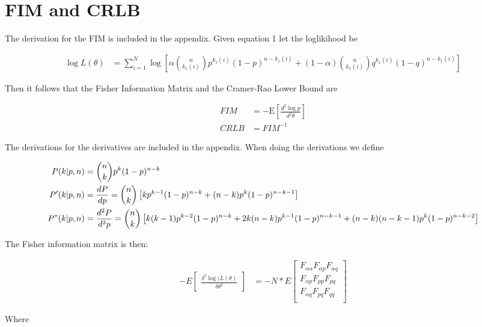 \section{FIM and CRLB}

The derivation for the FIM is included in the appendix. Given equation 1 let the loglikihood be

\begin{align*}
\log L(\mathbb{\theta}) &= \sum_{i=1}^{N} \log \left[ \alpha \binom{n}{k_1(i)} p^{k_1(i)} (1-p)^{n - k_1(i)} + (1-\alpha) \binom{n}{k_1(i)} q^{k_1(i)} (1-q)^{n - k_1(i)}  \right] 
\end{align*}

Then it follows that the Fisher Information Matrix and the Cramer-Rao Lower Bound are

\begin{align*}
FIM &= -\mathrm{E} \left[\frac{d^2 \log p}{d^2\mathbb{\theta}}\right] \\
CRLB &= FIM^{-1}
\end{align*}

The derivations for the derivatives are included in the appendix. When doing the derivations we define

\begin{align*}
P(k | p, n) &= \binom{n}{k}p^{k}(1 - p)^{n - k} \\
P'(k | p, n) &= \frac{dP}{dp} = \binom{n}{k}\left[kp^{k - 1}(1 - p)^{n - k} + (n - k)p^{k}(1 - p)^{n - k - 1}\right]\\
P"(k | p, n) &= \frac{d^2P}{d^2p} = \binom{n}{k}\left[k(k - 1)p^{k - 2}(1 - p)^{n - k} + 2k(n - k)p^{k - 1}(1 - p)^{n - k - 1} + (n - k)(n - k - 1)p^k(1 - p)^{n - k - 2}\right]\\
\end{align*}

The Fisher information matrix is then:

\begin{align*}
-E\begin{bmatrix}\frac{\delta^2\log(L(\mathbb{\theta})}{{\delta\theta}^2}\end{bmatrix} &= -N * E\begin{bmatrix}
F_{\alpha\alpha} F_{\alpha p} F_{\alpha q} \\
F_{\alpha p} F_{pp} F_{pq} \\
F_{\alpha q} F_{pq} F_{qq} \\
\end{bmatrix}
\end{align*}

Where

